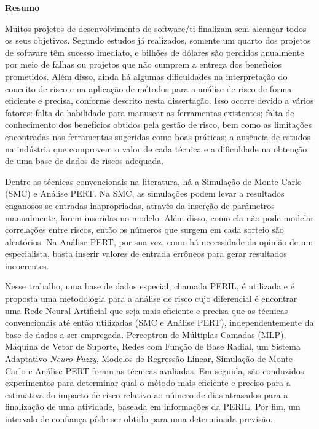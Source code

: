 \begin{flushbottom}
\begin{flushleft}
{\huge \textbf{Resumo}}
\linebreak
\end{flushleft}
Muitos projetos de desenvolvimento de software/ti finalizam sem alcançar todos os seus objetivos. Segundo estudos já realizados, somente um quarto dos projetos de software têm sucesso imediato, e bilhões de dólares são perdidos anualmente por meio de falhas ou projetos que não cumprem a entrega dos benefícios prometidos. Além disso, ainda há algumas dificuldades na interpretação do conceito de risco e na aplicação de métodos para a análise de risco de forma eficiente e precisa, conforme descrito nesta dissertação. Isso ocorre devido a vários fatores: falta de habilidade para manusear as ferramentas existentes; falta de conhecimento dos benefícios obtidos pela gestão de risco, bem como as limitações encontradas nas ferramentas sugeridas como boas práticas; a ausência de estudos na indústria que comprovem o valor de cada técnica e a dificuldade na obtenção de uma base de dados de riscos adequada.

Dentre as técnicas convencionais na literatura, há a Simulação de Monte Carlo (SMC) e Análise PERT. Na SMC, as simulações podem levar a resultados enganosos se entradas inapropriadas, através da inserção de parâmetros manualmente, forem inseridas no modelo. Além disso, como ela não pode modelar correlações entre riscos, então os números que surgem em cada sorteio são aleatórios. Na Análise PERT, por sua vez, como há necessidade da opinião de um especialista, basta inserir valores de entrada errôneos para gerar resultados incoerentes.

Nesse trabalho, uma base de dados especial, chamada PERIL, é utilizada e é proposta uma metodologia para a análise de risco cujo diferencial é encontrar uma Rede Neural Artificial que seja mais eficiente e precisa que as técnicas convencionais até então utilizadas (SMC e Análise PERT), independentemente da base de dados a ser empregada. Perceptron de Múltiplas Camadas (MLP), Máquina de Vetor de Suporte, Redes com Função de Base Radial, um Sistema Adaptativo \textit{Neuro-Fuzzy}, Modelos de Regressão Linear, Simulação de Monte Carlo e Análise PERT foram as técnicas avaliadas. Em seguida, são conduzidos experimentos para determinar qual o método mais eficiente e preciso para a estimativa do impacto de risco relativo ao número de dias atrasados para a finalização de uma atividade, baseada em informações da PERIL. Por fim, um intervalo de confiança pôde ser obtido para uma determinada previsão.


\end{flushbottom}
